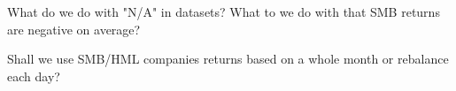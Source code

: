 What do we do with "N/A" in datasets?
What to we do with that SMB returns are negative on average?

Shall we use SMB/HML companies returns based on a whole month or rebalance each day?